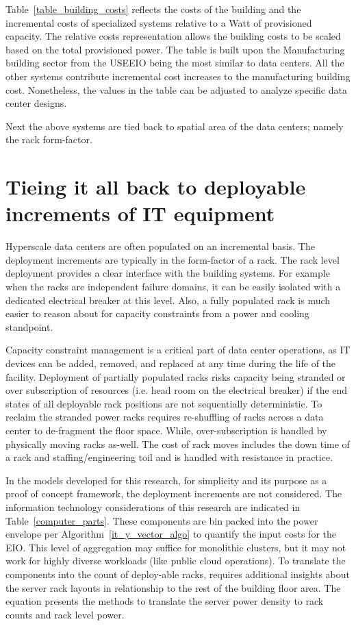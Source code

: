        
        
        Table~\ref{table_building_costs} reflects the costs of the building and the incremental costs of specialized systems relative to a Watt of provisioned capacity. The relative costs representation allows the building costs to be scaled based on the total provisioned power. The table is built upon the Manufacturing building sector from the USEEIO being the most similar to data centers. All the other systems contribute incremental cost increases to the manufacturing building cost. Nonetheless, the values in the table can be adjusted to analyze specific data center designs. 
        
        Next the above systems are tied back to spatial area of the data centers; namely the rack form-factor. 
        
    \section{Tieing it all back to deployable increments of IT equipment}
    
    Hyperscale data centers are often populated on an incremental basis. The deployment increments are typically in the form-factor of a rack. The rack level deployment provides a clear interface with the building systems. For example when the racks are independent failure domains, it can be easily isolated with a dedicated electrical breaker at this level. Also, a fully populated rack is much easier to reason about for capacity constraints from a power and cooling standpoint. 
    
    Capacity constraint management is a critical part of data center operations, as IT devices can be added, removed, and replaced at any time during the life of the facility. Deployment of partially populated racks risks capacity being stranded or over subscription of resources (i.e. head room on the electrical breaker) if the end states of all deployable rack positions are not sequentially deterministic. To reclaim the stranded power racks requires re-shuffling of racks across a data center to de-fragment the floor space. While, over-subscription is handled by physically moving racks as-well. The cost of rack moves includes the down time of a rack and staffing/engineering toil and is handled with resistance in practice.
    

    In the models developed for this research, for simplicity and its purpose as a proof of concept framework, the deployment increments are not considered. The information technology considerations of this research are indicated in Table~\ref{computer_parts}. These components are bin packed into the power envelope per Algorithm~\ref{it_y_vector_algo} to quantify the input costs for the EIO. This level of aggregation may suffice for monolithic clusters, but it may not work for highly diverse workloads (like public cloud operations). To translate the components into the count of deploy-able racks, requires additional insights about the server rack layouts in relationship to the rest of the building floor area. The equation presents the methods to translate the server power density to rack counts and rack level power.
    
